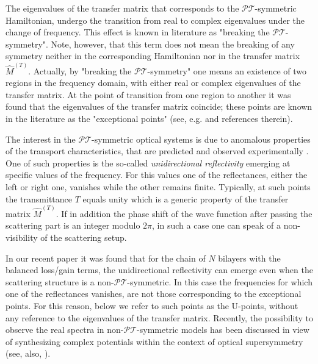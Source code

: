 \documentclass[aps,pra,reprint,showpacs,bibnotes,preprintnumbers,twoside,eqsecnum]{revtex4-1}
\begin{document}
The eigenvalues of the transfer matrix that corresponds to the $\mathcal{P}\mathcal{T}$-symmetric Hamiltonian, undergo the transition from real to complex eigenvalues under the change of frequency. This effect is known in literature as "breaking the $\mathcal{P}\mathcal{T}$-symmetry". Note, however, that this term does not mean the breaking of any symmetry neither in the corresponding Hamiltonian nor in the transfer matrix $\hat{M}^{(T)}$. Actually, by "breaking the $\mathcal{P}\mathcal{T}$-symmetry" one means an existence of two regions in the frequency domain, with either real or complex eigenvalues of the transfer matrix. At the point of transition from one region to another it was found that the eigenvalues of the transfer matrix coincide; these points are known in the literature as the "exceptional points" (see, e.g. \cite{23} and references therein).

The interest in the $\mathcal{P}\mathcal{T}$-symmetric optical systems is due to anomalous properties of the transport characteristics, that are predicted and observed experimentally \cite{1,3,Ro12,Lo11,L09,RKEC10,VHIC14,VIC15}. One of such properties is the so-called {\it unidirectional reflectivity} emerging at specific values of the frequency. For this values one of the reflectances, either the left or right one, vanishes while the other remains finite. Typically, at such points the transmittance $T$ equals unity which is a generic property of the transfer matrix $\hat{M}^{(T)}$. If in addition the phase shift of the wave function after passing the scattering part is an integer modulo $2\pi$, in such a case one can speak of a non-visibility of the scattering setup.

In our recent paper \cite{RIMC16} it was found that for the chain of $N$ bilayers with the balanced loss/gain terms, the unidirectional reflectivity can emerge even when the scattering structure is a non-$\mathcal{P}\mathcal{T}$-symmetric.  In this case the frequencies for which one of the reflectances vanishes, are not those corresponding to the exceptional points. For this reason, below we refer to such points as the U-points, without any reference to the eigenvalues of the transfer matrix. Recently, the possibility to observe the real spectra in non-$\mathcal{P}\mathcal{T}$-symmetric models has been discussed in view of synthesizing complex potentials within the context of optical supersymmetry \cite{MHC13} (see, also, \cite{Correa}).
\end{document}
